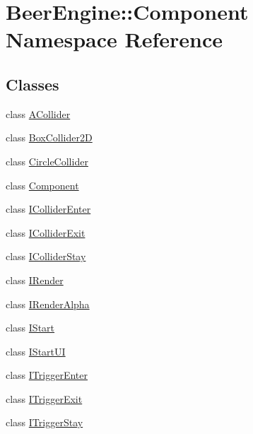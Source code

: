\hypertarget{namespace_beer_engine_1_1_component}{}\section{Beer\+Engine\+:\+:Component Namespace Reference}
\label{namespace_beer_engine_1_1_component}
\subsection*{Classes}
\begin{DoxyCompactItemize}
\item 
class \mbox{\hyperlink{class_beer_engine_1_1_component_1_1_a_collider}{A\+Collider}}
\item 
class \mbox{\hyperlink{class_beer_engine_1_1_component_1_1_box_collider2_d}{Box\+Collider2D}}
\item 
class \mbox{\hyperlink{class_beer_engine_1_1_component_1_1_circle_collider}{Circle\+Collider}}
\item 
class \mbox{\hyperlink{class_beer_engine_1_1_component_1_1_component}{Component}}
\item 
class \mbox{\hyperlink{class_beer_engine_1_1_component_1_1_i_collider_enter}{I\+Collider\+Enter}}
\item 
class \mbox{\hyperlink{class_beer_engine_1_1_component_1_1_i_collider_exit}{I\+Collider\+Exit}}
\item 
class \mbox{\hyperlink{class_beer_engine_1_1_component_1_1_i_collider_stay}{I\+Collider\+Stay}}
\item 
class \mbox{\hyperlink{class_beer_engine_1_1_component_1_1_i_render}{I\+Render}}
\item 
class \mbox{\hyperlink{class_beer_engine_1_1_component_1_1_i_render_alpha}{I\+Render\+Alpha}}
\item 
class \mbox{\hyperlink{class_beer_engine_1_1_component_1_1_i_start}{I\+Start}}
\item 
class \mbox{\hyperlink{class_beer_engine_1_1_component_1_1_i_start_u_i}{I\+Start\+UI}}
\item 
class \mbox{\hyperlink{class_beer_engine_1_1_component_1_1_i_trigger_enter}{I\+Trigger\+Enter}}
\item 
class \mbox{\hyperlink{class_beer_engine_1_1_component_1_1_i_trigger_exit}{I\+Trigger\+Exit}}
\item 
class \mbox{\hyperlink{class_beer_engine_1_1_component_1_1_i_trigger_stay}{I\+Trigger\+Stay}}
\item 

\end{DoxyCompactItemize}
